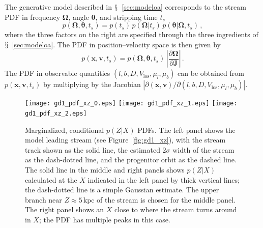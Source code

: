 \documentclass{emulateapj}
\renewcommand{\figurename}{Figure}
\newcommand{\sectionname}{$\mathsection$}
\renewcommand{\vec}[1]{\ensuremath{\mathbf{#1}}}
\newcommand{\vecx}{\ensuremath{\vec{x}}}
\newcommand{\vecv}{\ensuremath{\vec{v}}}
\newcommand{\vecj}{\ensuremath{\vec{J}}}
\newcommand{\veco}{\ensuremath{\vec{\Omega}}}
\newcommand{\veca}{\ensuremath{\boldsymbol\theta}}
\newcommand{\kpc}{\ensuremath{\,\mathrm{kpc}}}
\newcommand{\vlos}{\ensuremath{V_{\mathrm{los}}}}
\newcommand{\pmll}{\ensuremath{\mu_l}}
\newcommand{\pmbb}{\ensuremath{\mu_b}}
\begin{document}
The generative model described in \sectionname~\ref{sec:modeloa}
corresponds to the stream PDF in frequency $\veco$, angle $\veca$, and
stripping time $t_s$
\begin{equation}
  p(\veco,\veca,t_s) = p(t_s)\,p(\veco|t_s)\,p(\veca|\veco,t_s)\,,
\end{equation}
where the three factors on the right are specified through the three
ingredients of \sectionname~\ref{sec:modeloa}. The PDF in
position--velocity space is then given by
\begin{equation}\label{eq:pxvt}
  p(\vecx,\vecv,t_s) = p(\veco,\veca,t_s)\,\left|\frac{\partial
    \veco}{\partial \vecj}\right|\,.
\end{equation}
The PDF in observable quantities $(l,b,D,\vlos,\pmll,\pmbb)$ can be
obtained from $p(\vecx,\vecv,t_s)$ by multiplying by the Jacobian
$\left|\partial(\vecx,\vecv)/\partial(l,b,D,\vlos,\pmll,\pmbb)\right|$. 

\begin{figure}[t!]
 \texttt{[image: gd1\_pdf\_xz\_0.eps]}
 \texttt{[image: gd1\_pdf\_xz\_1.eps]}
 \texttt{[image: gd1\_pdf\_xz\_2.eps]}
 \caption{Marginalized, conditional $p(Z|X)$ PDFs. The left panel
   shows the model leading stream (see \figurename~\ref{fig:gd1_xz}),
   with the stream track shown as the solid line, the estimated
   $2\sigma$ width of the stream as the dash-dotted line, and the
   progenitor orbit as the dashed line. The solid line in the middle
   and right panels shows $p(Z|X)$ calculated at the $X$ indicated in
   the left panel by thick vertical lines; the dash-dotted line is a
   simple Gaussian estimate. The upper branch near $Z \approx 5\kpc$
   of the stream is chosen for the middle panel. The right panel shows
   an $X$ close to where the stream turns around in $X$; the PDF has
   multiple peaks in this case.}\label{fig:gd1_pdf_xz}
\end{figure}
\end{document}
